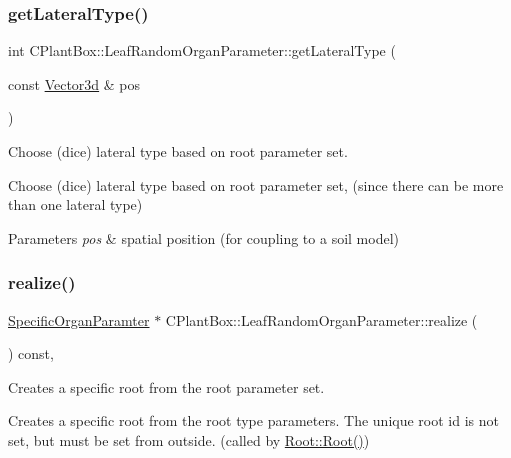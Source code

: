 \subsubsection{\texorpdfstring{get\+Lateral\+Type()}{getLateralType()}}
{\footnotesize\ttfamily int C\+Plant\+Box\+::\+Leaf\+Random\+Organ\+Parameter\+::get\+Lateral\+Type (\begin{DoxyParamCaption}\item[{const \hyperlink{classCPlantBox_1_1Vector3d}{Vector3d} \&}]{pos }\end{DoxyParamCaption})}



Choose (dice) lateral type based on root parameter set. 

Choose (dice) lateral type based on root parameter set, (since there can be more than one lateral type)


\begin{DoxyParams}{Parameters}
{\em pos} & spatial position (for coupling to a soil model) \\
\hline
\end{DoxyParams}
\mbox{\label{classCPlantBox_1_1LeafRandomOrganParameter_a3e6511d5398a096b39ab4dde8e7cf44f}} 
\subsubsection{\texorpdfstring{realize()}{realize()}}
{\footnotesize\ttfamily \hyperlink{classCPlantBox_1_1SpecificOrganParamter}{Specific\+Organ\+Paramter} $\ast$ C\+Plant\+Box\+::\+Leaf\+Random\+Organ\+Parameter\+::realize (\begin{DoxyParamCaption}{ }\end{DoxyParamCaption}) const\hspace{0.3cm}{\ttfamily [override]}, {\ttfamily [virtual]}}



Creates a specific root from the root parameter set. 

Creates a specific root from the root type parameters. The unique root id is not set, but must be set from outside. (called by \hyperlink{classCPlantBox_1_1Root_a9192f7ecf7ee409e8089365175b53f25}{Root\+::\+Root()})

